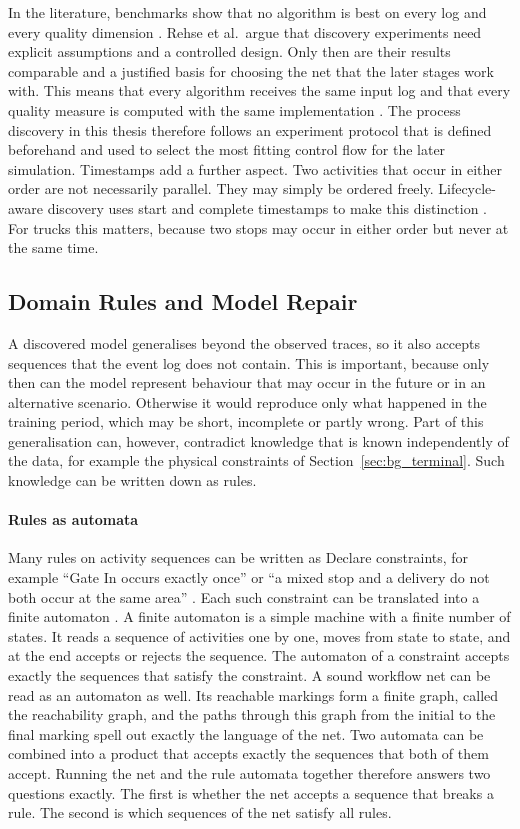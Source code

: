 In the literature, benchmarks show that no algorithm is best on every log and
every quality dimension \cite{DiscoveryBenchmark}. Rehse et al.\ argue that
discovery experiments need explicit assumptions and a controlled design. Only
then are their results comparable and a justified basis for choosing the net
that the later stages work with. This means that every algorithm receives the
same input log and that every quality measure is computed with the same
implementation \cite{RWRehse2024Experimentation}. The process discovery in this
thesis therefore follows an experiment protocol that is defined beforehand and
used to select the most fitting control flow for the later simulation. Timestamps
add a further aspect. Two activities that occur in either order are not necessarily
parallel. They may simply be ordered freely. Lifecycle-aware discovery uses
start and complete timestamps to make this distinction
\cite{RWLeemans2016Lifecycle}. For trucks this matters, because two stops may
occur in either order but never at the same time.

\subsection{Domain Rules and Model Repair}
\label{sec:bg_rules}

A discovered model generalises beyond the observed traces, so it also accepts
sequences that the event log does not contain. This is important, because only
then can the model represent behaviour that may occur in the future or in an
alternative scenario. Otherwise it would reproduce only what happened in the
training period, which may be short, incomplete or partly wrong. Part of this
generalisation can, however, contradict knowledge that is known independently of
the data, for example the physical constraints of Section~\ref{sec:bg_terminal}.
Such knowledge can be written down as rules.

\paragraph{Rules as automata}
Many rules on activity sequences can be written as Declare constraints, for
example ``Gate In occurs exactly once'' or ``a mixed stop and a delivery do not
both occur at the same area'' \cite{RWDiCiccio2022Declarative}. Each such
constraint can be translated into a finite automaton
\cite{RWMaggi2011Monitoring}. A finite automaton is a simple machine with a
finite number of states. It reads a sequence of activities one by one, moves
from state to state, and at the end accepts or rejects the sequence. The
automaton of a constraint accepts exactly the sequences that satisfy the
constraint. A sound workflow net can be read as an automaton as well. Its
reachable markings form a finite graph, called the reachability graph, and the
paths through this graph from the initial to the final marking spell out
exactly the language of the net. Two automata can be combined into a product
that accepts exactly the sequences that both of them accept. Running the net and
the rule automata together therefore answers two questions exactly. The first
is whether the net accepts a sequence that breaks a rule. The second is which
sequences of the net satisfy all rules.

